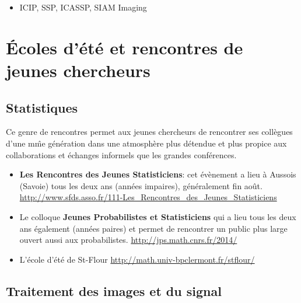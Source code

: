 \begin{itemize}
 \item ICIP, SSP, ICASSP, SIAM Imaging
\end{itemize}


\section{\'Ecoles d'\'et\'e et rencontres de jeunes chercheurs}


\subsection{Statistiques}
Ce genre de rencontres permet aux jeunes chercheurs de rencontrer ses collègues d'une m\^me génération
dans une atmosphère plus détendue et plus propice aux collaborations et échanges informels que les
grandes conférences. 
\begin{itemize}

\item \textbf{Les Rencontres des Jeunes Statisticiens}: cet \'ev\`enement a lieu \`a Aussois (Savoie) 
tous les deux ans (ann\'ees impaires), 
g\'en\'eralement fin août. \url{http://www.sfds.asso.fr/111-Les_Rencontres_des_Jeunes_Statisticiens}

\item Le colloque  \textbf{Jeunes Probabilistes et Statisticiens} qui a lieu tous les deux ans \'egalement 
(ann\'ees paires) et permet de rencontrer un public plus large ouvert aussi aux probabilistes. \url{http://jps.math.cnrs.fr/2014/}

\item L'école d'été de St-Flour \url{http://math.univ-bpclermont.fr/stflour/}

\end{itemize}


\subsection{Traitement des images et du signal}



